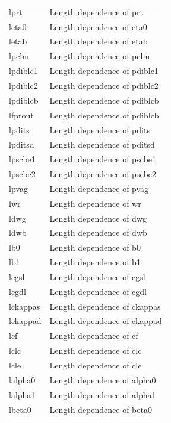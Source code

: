 \begin{longtable}{l l}
{\small lprt} & {\small Length dependence of prt } \\    
{\small leta0} & {\small Length dependence of eta0} \\   
{\small letab} & {\small Length dependence of etab} \\   
{\small lpclm} & {\small Length dependence of pclm} \\   
{\small lpdiblc1} & {\small Length dependence of pdiblc1} \\   
{\small lpdiblc2} & {\small Length dependence of pdiblc2} \\   
{\small lpdiblcb} & {\small Length dependence of pdiblcb} \\   
{\small lfprout} & {\small Length dependence of pdiblcb} \\
{\small lpdits} & {\small Length dependence of pdits} \\
{\small lpditsd} & {\small Length dependence of pditsd} \\
{\small lpscbe1} & {\small Length dependence of pscbe1} \\   
{\small lpscbe2} & {\small Length dependence of pscbe2} \\   
{\small lpvag} & {\small Length dependence of pvag} \\   
{\small lwr} & {\small Length dependence of wr} \\
{\small ldwg} & {\small Length dependence of dwg} \\
{\small ldwb} & {\small Length dependence of dwb} \\
{\small lb0} & {\small Length dependence of b0} \\
{\small lb1} & {\small Length dependence of b1} \\
{\small lcgsl} & {\small Length dependence of cgsl} \\
{\small lcgdl} & {\small Length dependence of cgdl} \\
{\small lckappas} & {\small Length dependence of ckappas} \\
{\small lckappad} & {\small Length dependence of ckappad} \\
{\small lcf} & {\small Length dependence of cf} \\
{\small lclc} & {\small Length dependence of clc} \\
{\small lcle} & {\small Length dependence of cle} \\
{\small lalpha0} & {\small Length dependence of alpha0} \\
{\small lalpha1} & {\small Length dependence of alpha1} \\
{\small lbeta0} & {\small Length dependence of beta0} \\


\end{longtable}
